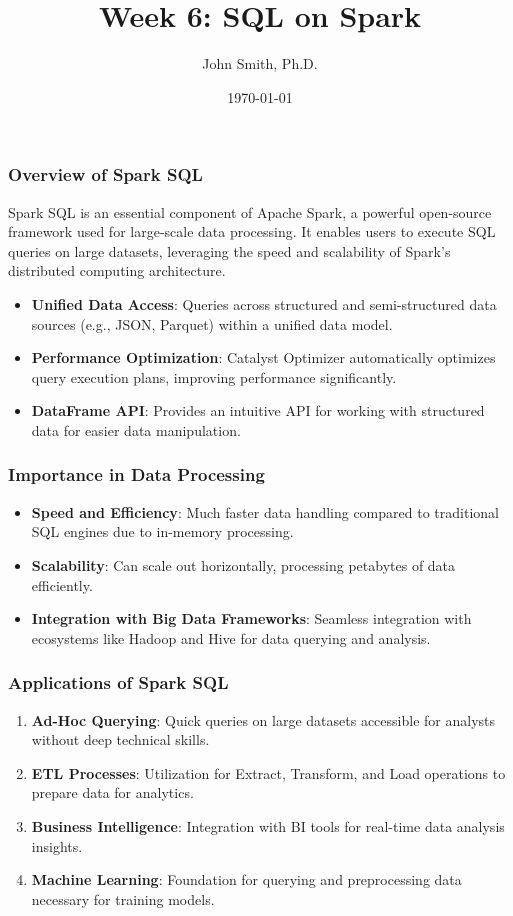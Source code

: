 \documentclass[aspectratio=169]{beamer}
\title[Week 6: SQL on Spark]{Week 6: SQL on Spark}
\author[J. Smith]{John Smith, Ph.D.}
\institute[University Name]{
  Department of Computer Science\\
  University Name\\
  \vspace{0.3cm}
  Email: email@university.edu\\
  Website: www.university.edu
}
\date{\today}
\begin{document}
\frame{\titlepage}

\begin{frame}[fragile]
    \titlepage
\end{frame}

\begin{frame}[fragile]
    \frametitle{Overview of Spark SQL}
    Spark SQL is an essential component of Apache Spark, a powerful open-source framework used for large-scale data processing.
    It enables users to execute SQL queries on large datasets, leveraging the speed and scalability of Spark's distributed computing architecture.
    
    \begin{itemize}
        \item \textbf{Unified Data Access}: Queries across structured and semi-structured data sources (e.g., JSON, Parquet) within a unified data model.
        \item \textbf{Performance Optimization}: Catalyst Optimizer automatically optimizes query execution plans, improving performance significantly.
        \item \textbf{DataFrame API}: Provides an intuitive API for working with structured data for easier data manipulation.
    \end{itemize}
\end{frame}

\begin{frame}[fragile]
    \frametitle{Importance in Data Processing}
    \begin{itemize}
        \item \textbf{Speed and Efficiency}: Much faster data handling compared to traditional SQL engines due to in-memory processing.
        \item \textbf{Scalability}: Can scale out horizontally, processing petabytes of data efficiently.
        \item \textbf{Integration with Big Data Frameworks}: Seamless integration with ecosystems like Hadoop and Hive for data querying and analysis.
    \end{itemize}
\end{frame}

\begin{frame}[fragile]
    \frametitle{Applications of Spark SQL}
    \begin{enumerate}
        \item \textbf{Ad-Hoc Querying}: Quick queries on large datasets accessible for analysts without deep technical skills.
        \item \textbf{ETL Processes}: Utilization for Extract, Transform, and Load operations to prepare data for analytics.
        \item \textbf{Business Intelligence}: Integration with BI tools for real-time data analysis insights.
        \item \textbf{Machine Learning}: Foundation for querying and preprocessing data necessary for training models.
    \end{enumerate}
\end{frame}
\end{document}
